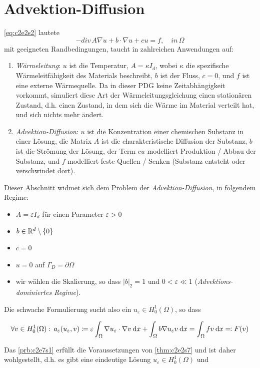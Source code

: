 \documentclass[../skript.tex]{subfiles}
\begin{document}
\section{Advektion-Diffusion}\label{sec:c2e7}
\cref{eq:c2e2s2} lautete
\[
	-div\,{A}\nabla u + b\cdot\nabla u + c u = f,\quad in\,\Omega
\]
mit geeigneten Randbedingungen, taucht in zahlreichen Anwendungen auf:
\begin{enumerate}
	\item \emph{Wärmeleitung}: $u$ ist die Temperatur, $A=\kappa I_d$, wobei $\kappa$ die spezifische Wärmeleitfähigkeit des Materials beschreibt, $b$ ist der Fluss, $c=0$, und $f$ ist eine externe Wärmequelle. Da in dieser PDG keine Zeitabhängigkeit vorkommt, simuliert diese Art der Wärmeleitungsgleichung einen stationären Zustand, d.h. einen Zustand, in dem sich die Wärme im Material verteilt hat, und sich nichts mehr ändert. 
	\item \emph{Advektion-Diffusion}: $u$ ist die Konzentration einer chemischen Substanz in einer Lösung, die Matrix $A$ ist die charakteristische Diffusion der Substanz, $b$ ist die Strömung der Lösung, der Term $cu$ modelliert Produktion / Abbau der Substanz, und $f$ modelliert feste Quellen / Senken (Substanz entsteht oder verschwindet dort).
\end{enumerate}
Dieser Abschnitt widmet sich dem Problem der \emph{Advektion-Diffusion}, in folgendem Regime:
\begin{itemize}
	\item $A = \varepsilon I_d$ für einen Parameter $\varepsilon > 0$
	\item $b\in\mathbb{R}^d\setminus\{0\}$
	\item $c=0$
	\item $u=0$ auf $\Gamma_D = \partial\Omega$
	\item wir wählen die Skalierung, so dass $|b|_2=1$ und $0<\varepsilon \ll 1$ (\emph{Advektions-dominiertes Regime}).
\end{itemize}
Die schwache  Formulierung sucht also ein $u_\varepsilon\in H^1_0(\Omega)$, so dass 
\begin{problem}\label{prb:c2e7s1}
\[ 
	\forall v\in H^1_0(\Omega):\,a_\varepsilon(u_\varepsilon,v) \coloneqq \varepsilon \int_\Omega\nabla u_\varepsilon\cdot\nabla v\:\mathrm{d}x + \int_\Omega b\nabla u_\varepsilon v\:\mathrm{d}x = \int_\Omega fv\:\mathrm{d}x \eqqcolon F(v)
\]
\end{problem}
Das \cref{prb:c2e7s1} erfüllt die Voraussetzungen von \cref{thm:c2e2s7} und ist daher wohlgestellt, d.h. es gibt eine eindeutige Lösung $u_\varepsilon\in H^1_0(\Omega)$ und 
\end{document}
